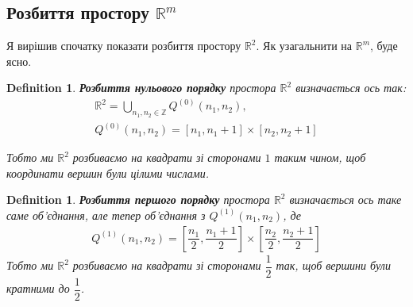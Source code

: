 \documentclass[a4paper, 10pt]{article}
\theoremstyle{theoremdd}
\theoremstyle{theoremdd}
\newtheorem{definition}[theorem]{Definition}
\theoremstyle{theoremdd}
\theoremstyle{theoremdd}
\theoremstyle{theoremdd}
\theoremstyle{theoremdd}
\theoremstyle{theoremdd}
\theoremstyle{theoremdd}
\begin{document}
\subsection{Розбиття простору $\mathbb{R}^m$}
Я вирішив спочатку показати розбиття простору $\mathbb{R}^2$. Як узагальнити на $\mathbb{R}^m$, буде ясно.
\begin{definition}
\textbf{Розбиття нульового порядку} простора $\mathbb{R}^2$ визначається ось так:
\begin{align*}
\mathbb{R}^2 = \bigcup_{n_1,n_2 \in \mathbb{Z}} Q^{(0)}(n_1,n_2), \\
Q^{(0)}(n_1,n_2) = [n_1,n_1+1] \times [n_2,n_2+1]
\end{align*}
\iffalse
Q^{(0)}(n_1,n_2) = \{ (x,y): x \in [n_1,n_1+1], \hspace{0.5cm} y \in [n_2,n_2+1]\} \\
\fi
Тобто ми $\mathbb{R}^2$ розбиваємо на квадрати зі сторонами $1$ таким чином, щоб координати вершин були цілими числами.
\end{definition}

\begin{figure}[H]
\centering
{}
\end{figure}

\begin{definition}
\textbf{Розбиття першого порядку} простора $\mathbb{R}^2$ визначається ось таке саме об'єднання, але тепер об'єднання з $Q^{(1)}(n_1,n_2)$, де
\begin{align*}
Q^{(1)}(n_1,n_2) = \left[ \dfrac{n_1}{2}, \dfrac{n_1+1}{2} \right] \times \left[ \dfrac{n_2}{2}, \dfrac{n_2+1}{2} \right]
\iffalse Q^{(1)} = \left\{ (x,y): x \in \left[\dfrac{n_1}{2},\dfrac{n_1+1}{2} \right], \hspace{0.5cm} y \in \left[\dfrac{n_2}{2},\dfrac{n_2+1}{2} \right] \right\}
\fi
\end{align*}
Тобто ми $\mathbb{R}^2$ розбиваємо на квадрати зі сторонами $\dfrac{1}{2}$ так, щоб вершини були кратними до $\dfrac{1}{2}$.
\end{definition}

\begin{figure}[H]
\centering
{}
\end{figure}
\end{document}
